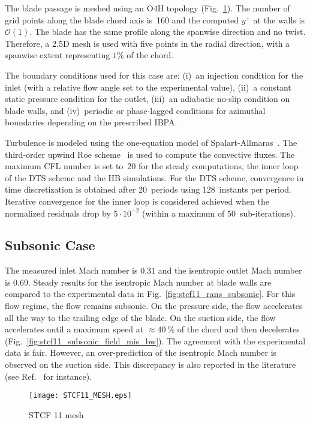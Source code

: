 The blade passage is meshed using an O4H topology (Fig.~\ref{fig:stcf11_mesh}).  
The number of grid points along the blade
chord axis is~160 and the computed $y^+$ at the walls is $\mathcal{O}(1)$. %
The blade has the same profile along the spanwise direction and no
twist. Therefore, a 2.5D mesh is used with five points in the radial direction, with a spanwise
extent representing $1\%$ of the chord. 

The boundary conditions used for this case are: (i)~an
injection condition  for the inlet (with a relative flow angle
set to the  experimental value), (ii)~a constant static pressure
condition for the outlet,  (iii)~an adiabatic no-slip condition on
blade walls, and (iv)~periodic or phase-lagged conditions for azimuthal boundaries depending on the  
prescribed IBPA.

Turbulence is modeled using the one-equation model of
Spalart-Allmaras~\cite{Spalart1992}.  The third-order upwind Roe
scheme~\cite{Roe1981} is used to compute the convective fluxes.
The maximum
CFL number is set to~20 for the steady computations,  the inner loop
of the DTS scheme and the HB simulations.  For the DTS scheme,  
convergence in time discretization is obtained
after 20~periods using 128~instants per period.  Iterative convergence 
for the inner loop is considered achieved when the normalized
residuals drop by $5\cdot 10^{-2}$ (within a maximum of
50~sub-iterations).

\subsection{Subsonic Case}
The measured inlet Mach number is $0.31$ and the isentropic outlet Mach number is $0.69$.
Steady results for the isentropic Mach number at blade walls are compared to the experimental data in 
Fig.~\ref{fig:stcf11_rans_subsonic}.  For this flow regime, the flow
remains subsonic.
On the pressure side, the flow accelerates all the way
to the trailing edge of the blade. On the suction side, the flow
accelerates until a maximum speed at $\approx 40~\%$ of the chord and
then decelerates (Fig.~\ref{fig:stcf11_subsonic_field_mis_bw}).
The agreement with the experimental data is fair. However, an
over-prediction of the isentropic Mach number is observed on the suction
side.  This discrepancy is also reported in the literature (see
Ref.~\cite{Fransson:1999uq} for instance).
\begin{figure}[htb]
  \centering
  \texttt{[image: STCF11\_MESH.eps]}
  \caption{STCF 11 mesh}
  \label{fig:stcf11_mesh}
\end{figure}

